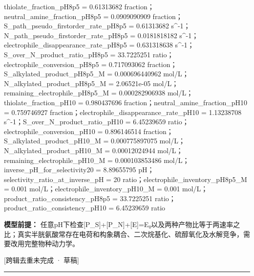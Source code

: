 \documentclass[UTF8,11pt,a4paper]{ctexart}
\begin{document}
thiolate\_fraction\_pH8p5 = 0.61313682 fraction；neutral\_amine\_fraction\_pH8p5 = 0.0909090909 fraction；S\_path\_pseudo\_firstorder\_rate\_pH8p5 = 0.61313682 s\textasciicircum{}-1；N\_path\_pseudo\_firstorder\_rate\_pH8p5 = 0.0181818182 s\textasciicircum{}-1；electrophile\_disappearance\_rate\_pH8p5 = 0.631318638 s\textasciicircum{}-1；S\_over\_N\_product\_ratio\_pH8p5 = 33.7225251 ratio；electrophile\_conversion\_pH8p5 = 0.717093062 fraction；S\_alkylated\_product\_pH8p5\_M = 0.000696440962 mol/L；N\_alkylated\_product\_pH8p5\_M = 2.06521e-05 mol/L；remaining\_electrophile\_pH8p5\_M = 0.000282906938 mol/L；thiolate\_fraction\_pH10 = 0.980437696 fraction；neutral\_amine\_fraction\_pH10 = 0.759746927 fraction；electrophile\_disappearance\_rate\_pH10 = 1.13238708 s\textasciicircum{}-1；S\_over\_N\_product\_ratio\_pH10 = 6.45239659 ratio；electrophile\_conversion\_pH10 = 0.896146514 fraction；S\_alkylated\_product\_pH10\_M = 0.000775897075 mol/L；N\_alkylated\_product\_pH10\_M = 0.00012024944 mol/L；remaining\_electrophile\_pH10\_M = 0.000103853486 mol/L；inverse\_pH\_for\_selectivity20 = 8.89655795 pH；selectivity\_ratio\_at\_inverse\_pH = 20 ratio；electrophile\_inventory\_pH8p5\_M = 0.001 mol/L；electrophile\_inventory\_pH10\_M = 0.001 mol/L；product\_ratio\_consistency\_pH8p5 = 33.7225251 ratio；product\_ratio\_consistency\_pH10 = 6.45239659 ratio\par
\noindent\textbf{模型前提：}
任意pH下检查[P\_S]+[P\_N]+[E]=E₀以及两种产物比等于两速率之比；真实半胱氨酸常存在电荷和构象耦合、二次烷基化、硫醇氧化及水解竞争，需要改用完整物种动力学。\par
\noindent\textcolor{red!65!black}{[跨辑去重未完成 · 草稿]} \par
\medskip\hrule\medskip
{}
\end{document}
